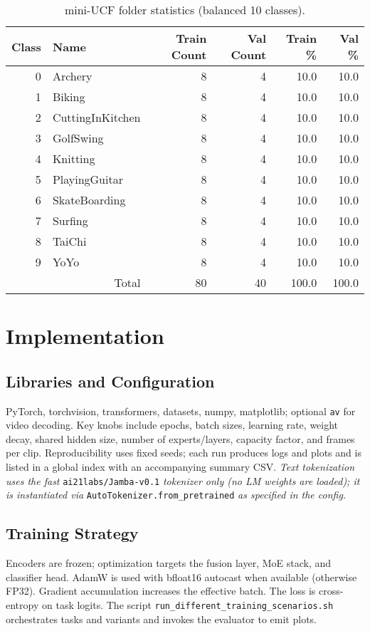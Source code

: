 \documentclass[11pt,a4paper]{article}
\begin{document}
\begin{table}[H]
\centering
\caption{mini-UCF folder statistics (balanced 10 classes).}
\begin{tabular}{@{}r l r r r r@{}}
\toprule
Class & Name & Train Count & Val Count & Train \% & Val \% \\
\midrule
0 & Archery           & 8 & 4 & 10.0 & 10.0 \\
1 & Biking            & 8 & 4 & 10.0 & 10.0 \\
2 & CuttingInKitchen  & 8 & 4 & 10.0 & 10.0 \\
3 & GolfSwing         & 8 & 4 & 10.0 & 10.0 \\
4 & Knitting          & 8 & 4 & 10.0 & 10.0 \\
5 & PlayingGuitar     & 8 & 4 & 10.0 & 10.0 \\
6 & SkateBoarding     & 8 & 4 & 10.0 & 10.0 \\
7 & Surfing           & 8 & 4 & 10.0 & 10.0 \\
8 & TaiChi            & 8 & 4 & 10.0 & 10.0 \\
9 & YoYo              & 8 & 4 & 10.0 & 10.0 \\
\midrule
\multicolumn{2}{r}{Total} & 80 & 40 & 100.0 & 100.0 \\
\bottomrule
\end{tabular}
\end{table}

\section{Implementation}
\subsection{Libraries and Configuration}
PyTorch, torchvision, transformers, datasets, numpy, matplotlib; optional \texttt{av} for video decoding. Key knobs include epochs, batch sizes, learning rate, weight decay, shared hidden size, number of experts/layers, capacity factor, and frames per clip. Reproducibility uses fixed seeds; each run produces logs and plots and is listed in a global index with an accompanying summary CSV.
\textit{Text tokenization uses the fast} \texttt{ai21labs/Jamba-v0.1} \textit{tokenizer only (no LM weights are loaded); it is instantiated via} \texttt{AutoTokenizer.from\_pretrained} \textit{as specified in the config.}

\subsection{Training Strategy}
Encoders are frozen; optimization targets the fusion layer, MoE stack, and classifier head. AdamW is used with bfloat16 autocast when available (otherwise FP32). Gradient accumulation increases the effective batch. The loss is cross-entropy on task logits. The script \texttt{run\_different\_training\_scenarios.sh} orchestrates tasks and variants and invokes the evaluator to emit plots.
\end{document}
